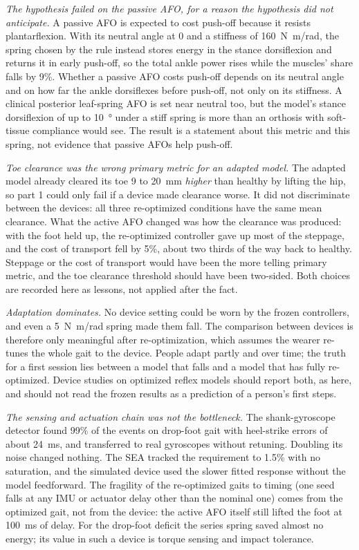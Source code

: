 \emph{The hypothesis failed on the passive AFO, for a reason the hypothesis did not anticipate.} A passive AFO is expected to cost push-off because it resists plantarflexion. With its neutral angle at 0 and a stiffness of \SI{160}{N.m/rad}, the spring chosen by the rule instead stores energy in the stance dorsiflexion and returns it in early push-off, so the total ankle power rises while the muscles' share falls by 9\%. Whether a passive AFO costs push-off depends on its neutral angle and on how far the ankle dorsiflexes before push-off, not only on its stiffness. A clinical posterior leaf-spring AFO is set near neutral too, but the model's stance dorsiflexion of up to \SI{10}{\degree} under a stiff spring is more than an orthosis with soft-tissue compliance would see. The result is a statement about this metric and this spring, not evidence that passive AFOs help push-off.

\emph{Toe clearance was the wrong primary metric for an adapted model.} The adapted model already cleared its toe 9 to 20~mm \emph{higher} than healthy by lifting the hip, so part 1 could only fail if a device made clearance worse. It did not discriminate between the devices: all three re-optimized conditions have the same mean clearance. What the active AFO changed was how the clearance was produced: with the foot held up, the re-optimized controller gave up most of the steppage, and the cost of transport fell by 5\%, about two thirds of the way back to healthy. Steppage or the cost of transport would have been the more telling primary metric, and the toe clearance threshold should have been two-sided. Both choices are recorded here as lessons, not applied after the fact.

\emph{Adaptation dominates.} No device setting could be worn by the frozen controllers, and even a \SI{5}{N.m/rad} spring made them fall. The comparison between devices is therefore only meaningful after re-optimization, which assumes the wearer re-tunes the whole gait to the device. People adapt partly and over time; the truth for a first session lies between a model that falls and a model that has fully re-optimized. Device studies on optimized reflex models should report both, as here, and should not read the frozen results as a prediction of a person's first steps.

\emph{The sensing and actuation chain was not the bottleneck.} The shank-gyroscope detector found 99\% of the events on drop-foot gait with heel-strike errors of about 24~ms, and transferred to real gyroscopes without retuning. Doubling its noise changed nothing. The SEA tracked the requirement to 1.5\% with no saturation, and the simulated device used the slower fitted response without the model feedforward. The fragility of the re-optimized gaits to timing (one seed falls at any IMU or actuator delay other than the nominal one) comes from the optimized gait, not from the device: the active AFO itself still lifted the foot at 100~ms of delay. For the drop-foot deficit the series spring saved almost no energy; its value in such a device is torque sensing and impact tolerance.
